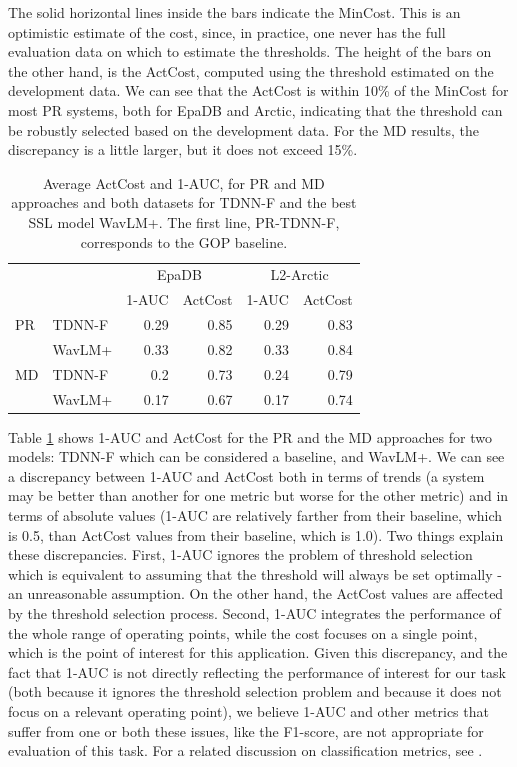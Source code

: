 \documentclass{INTERSPEECH2023}
\begin{document}
The solid horizontal lines inside the bars indicate the MinCost. This is an optimistic estimate of the cost, since, in practice, one never has the full evaluation data on which to estimate the thresholds. The height of the bars on the other hand, is the ActCost, computed using the threshold estimated on the development data. We can see that the ActCost is within 10\% of the MinCost for most PR systems, both for EpaDB and Arctic, indicating that the threshold can be robustly selected based on the development data. For the MD results, the discrepancy is a little larger, but it does not exceed 15\%.

{
\begin{table}[t]
\footnotesize
\centering
\begin{tabular}{p{3pt}lrrrr}
 & & \multicolumn{2}{c}{EpaDB} & \multicolumn{2}{c}{L2-Arctic} \\
 & & 1-AUC & ActCost & 1-AUC & ActCost \\
\midrule
PR & TDNN-F      & 0.29 & 0.85  & 0.29 & 0.83 \\
 & WavLM+        & 0.33 & 0.82  & 0.33 & 0.84 \\
\midrule
MD & TDNN-F     & 0.2 & 0.73  & 0.24 & 0.79 \\
& WavLM+        & 0.17 & 0.67  & 0.17 & 0.74 \\
\bottomrule
\end{tabular}
\caption{Average ActCost and 1-AUC, for PR and MD approaches and both datasets for TDNN-F and the best SSL model WavLM+. The first line, PR-TDNN-F, corresponds to the GOP baseline.}
\label{tab:my_label}
\end{table}
}
Table \ref{tab:my_label} shows 1-AUC and ActCost for the PR and the MD approaches for two models: TDNN-F which can be considered a baseline, and WavLM+. We can see a discrepancy between 1-AUC and ActCost both in terms of trends (a system may be better than another for one metric but worse for the other metric) and in terms of absolute values (1-AUC are relatively farther from their baseline, which is 0.5, than ActCost values from their baseline, which is 1.0). Two things explain these discrepancies. First, 1-AUC ignores the problem of threshold selection which is equivalent to assuming that the threshold will always be set optimally - an unreasonable assumption. On the other hand, the ActCost values are affected by the threshold selection process. Second, 1-AUC integrates the performance of the whole range of operating points, while the cost focuses on a single point, which is the point of interest for this application. Given this discrepancy, and the fact that 1-AUC is not directly reflecting the performance of interest for our task (both because it ignores the threshold selection problem and because it does not focus on a relevant operating point), we believe 1-AUC and other metrics that suffer from one or both these issues, like the F1-score, are not appropriate for evaluation of this task. For a related discussion on classification metrics, see \cite{ferrer2022analysis}. 
\end{document}
